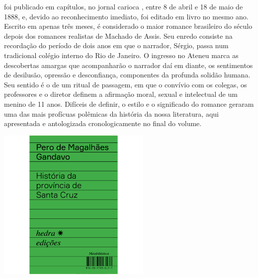 \hspace*{-7cm}\hrulefill\hspace*{-7cm}

\medskip

 foi publicado em capítulos,
no jornal carioca {}, entre 8 de abril e 18 de maio de 1888, e,
devido ao reconhecimento imediato, foi editado em livro no mesmo ano.
Escrito em apenas três meses, é considerado o maior romance brasileiro do
século  depois dos romances realistas de Machado de Assis. Seu
enredo consiste na recordação do período de dois anos em que o narrador,
Sérgio, passa num tradicional colégio interno do Rio de Janeiro. O
ingresso no Ateneu marca as descobertas amargas que acompanharão o
narrador daí em diante, os sentimentos de desilusão, opressão e
desconfiança, componentes da profunda solidão humana. Seu sentido é o
de um ritual de passagem, em que o convívio com os colegas, os
professores e o diretor definem a afirmação moral, sexual e intelectual
de um menino de 11 anos. Difíceis de definir, o estilo e o
significado do romance geraram uma das mais profícuas polêmicas da
história da nossa literatura, aqui apresentada e antologizada
cronologicamente no final do volume.


\vfill

\hspace*{-.4cm}\begin{minipage}[c]{.5\linewidth}
\small{
{}}
\end{minipage}

\pagebreak

\begin{center}
\hspace*{-3.6cm}
\hspace*{3.1cm}\includegraphics[width=74mm]{./grid/gandavo.jpg}
\end{center}

